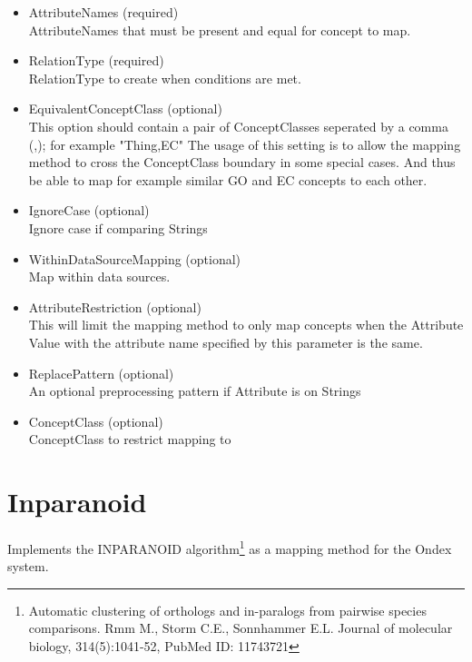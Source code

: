 \begin{itemize}
  
  \item{AttributeNames (required)}\\
  AttributeNames that must be present and equal for concept to map.
  
  \item{RelationType (required)}\\
  RelationType to create when conditions are met.
  
  \item{EquivalentConceptClass (optional)}\\
  This option should contain a pair of ConceptClasses seperated by a comma (,); for example "Thing,EC" 
  The usage of this setting is to allow the mapping method to cross the ConceptClass boundary in some special cases. 
  And thus be able to map for example similar GO and EC concepts to each other.
  
  \item{IgnoreCase (optional)}\\
  Ignore case if comparing Strings
  
  \item{WithinDataSourceMapping (optional)}\\
  Map within data sources.
  
  \item{AttributeRestriction (optional)}\\
  This will limit the mapping method to only map concepts when the Attribute Value with the attribute name specified by this parameter is the same.
  
  \item{ReplacePattern (optional)}\\
  An optional preprocessing pattern if Attribute is on Strings
  
  \item{ConceptClass (optional)}\\
  ConceptClass to restrict mapping to

\end{itemize}


\section{Inparanoid}
Implements the INPARANOID algorithm\footnote{Automatic clustering of orthologs and in-paralogs from pairwise species comparisons.
Rmm M., Storm C.E., Sonnhammer E.L. Journal of molecular biology, 314(5):1041-52, PubMed ID: 11743721} as a mapping method for the Ondex system.

